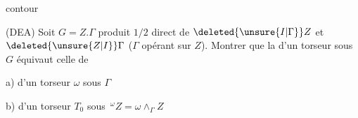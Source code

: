 contour

\uline{} (DEA) Soit $G=Z.\Gamma$ produit $1/2$ direct de $\deleted{\unsure{I|\Gamma}}Z$ et $\deleted{\unsure{Z|I}}\Gamma$ ($\Gamma$ opérant sur $Z$). Montrer que la  d'un torseur  sous $G$ équivaut  celle de

a) d'un torseur $\omega$ sous $\Gamma$

b) d'un torseur $T_0$ sous $\,{}^\omega Z=\omega\wedge_\Gamma Z$

